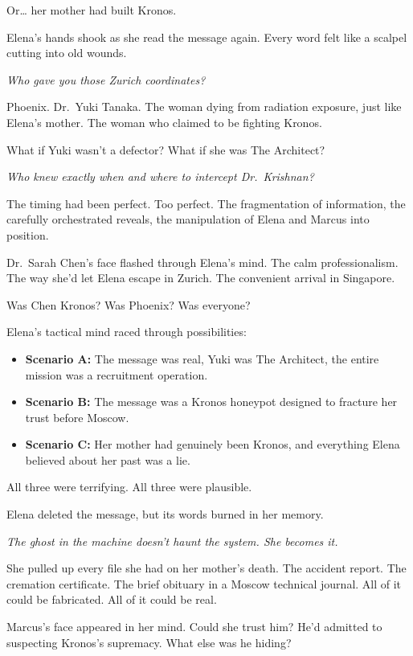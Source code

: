 \documentclass[12pt,letterpaper]{book}
\providecommand{\tightlist}{\setlength{\itemsep}{0pt}\setlength{\parskip}{0pt}}
\begin{document}
Or\ldots{} her mother had built Kronos.

Elena's hands shook as she read the message again. Every word felt like a scalpel cutting into old wounds.

\emph{Who gave you those Zurich coordinates?}

Phoenix. Dr.~Yuki Tanaka. The woman dying from radiation exposure, just like Elena's mother. The woman who claimed to be fighting Kronos.

What if Yuki wasn't a defector? What if she was The Architect?

\emph{Who knew exactly when and where to intercept Dr.~Krishnan?}

The timing had been perfect. Too perfect. The fragmentation of information, the carefully orchestrated reveals, the manipulation of Elena and Marcus into position.

Dr.~Sarah Chen's face flashed through Elena's mind. The calm professionalism. The way she'd let Elena escape in Zurich. The convenient arrival in Singapore.

Was Chen Kronos? Was Phoenix? Was everyone?

Elena's tactical mind raced through possibilities:

\begin{itemize}
\tightlist
\item
  \textbf{Scenario A:} The message was real, Yuki was The Architect, the entire mission was a recruitment operation.
\item
  \textbf{Scenario B:} The message was a Kronos honeypot designed to fracture her trust before Moscow.
\item
  \textbf{Scenario C:} Her mother had genuinely been Kronos, and everything Elena believed about her past was a lie.
\end{itemize}

All three were terrifying. All three were plausible.

Elena deleted the message, but its words burned in her memory.

\emph{The ghost in the machine doesn't haunt the system. She becomes it.}

She pulled up every file she had on her mother's death. The accident report. The cremation certificate. The brief obituary in a Moscow technical journal. All of it could be fabricated. All of it could be real.

Marcus's face appeared in her mind. Could she trust him? He'd admitted to suspecting Kronos's supremacy. What else was he hiding?
\end{document}
